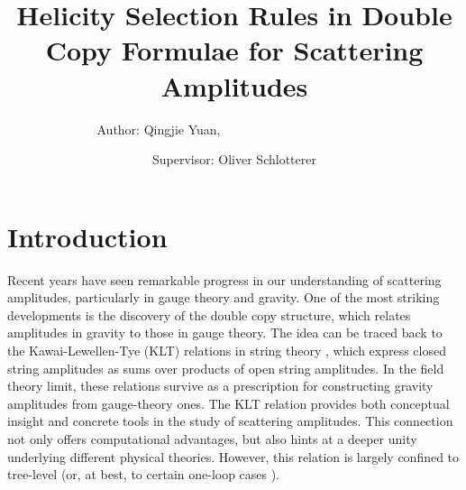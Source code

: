 \documentclass[a4paper,11pt]{article}
\title{Helicity Selection Rules in Double Copy Formulae for Scattering Amplitudes}
\author{Author: Qingjie Yuan,$\qquad\qquad\qquad\qquad\qquad\qquad$}
\author{Supervisor: Oliver Schlotterer}
\affiliation{Department of Physics and Astronomy, Uppsala University, \\Box 516, 75120 Uppsala, Sweden}
\begin{document}
\newcommand{\sket}[1]{|#1]}
\newcommand{\sbra}[1]{[#1|}
\newcommand{\ads}[3]{\langle #1|#2|#3]}
\newcommand{\sda}[3]{[#1|#2|#3\rangle}
\renewcommand{\braket}[1]{\langle #1 \rangle}
\newcommand{\Xij}[2]{\braket{\eta #1}[#1 #2]\braket{#2 \eta}}

\newcommand{\etal}[1]{\braket{\eta #1}}
\newcommand{\etar}[1]{\braket{#1 \eta}}


\maketitle
\tableofcontents

\allowdisplaybreaks
\section{Introduction}
Recent years have seen remarkable progress in our understanding of scattering amplitudes, particularly in gauge theory and gravity.
One of the most striking developments is the discovery of the double copy structure, which relates amplitudes in gravity to those in gauge theory.
The idea can be traced back to the Kawai-Lewellen-Tye (KLT) relations in string theory \cite{Kawai:1985xq}, which express closed string amplitudes as sums over products of open string amplitudes.
In the field theory limit, these relations survive as a prescription for constructing gravity amplitudes from gauge-theory ones. The KLT relation provides both conceptual insight
and concrete tools in the study of scattering amplitudes. This connection not only offers computational advantages,
but also hints at a deeper unity underlying different physical theories. However, this relation is largely confined to tree-level (or, at best, to certain one-loop cases \cite{He:2016mzd}).\par
\end{document}
